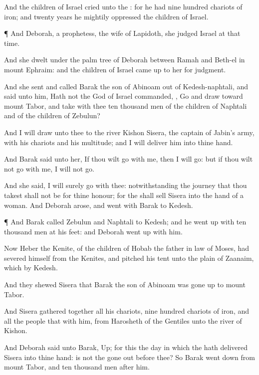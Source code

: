 {And the
children of
Israel
cried unto the
{}: for he had
nine
hundred
chariots of
iron; and
twenty
years he
mightily
oppressed the
children of
Israel.


\par }{\PP {}¶ And
Deborah, a
prophetess, the
wife of
Lapidoth, she
judged
Israel at that
time.

And she
dwelt under the palm
tree of
Deborah between
Ramah and
Beth-el in
mount
Ephraim: and the
children of
Israel came
up to her for
judgment.

And she
sent and
called
Barak the
son of
Abinoam out of
Kedesh-naphtali, and
said unto him, Hath not the
{}
God of
Israel
commanded,
{},
Go and
draw toward
mount
Tabor, and
take with thee
ten
thousand
men of the
children of
Naphtali and of the
children of
Zebulun?

And I will
draw unto thee to the
river
Kishon
Sisera, the
captain of
Jabin’s
army, with his
chariots and his
multitude; and I will
deliver him into thine
hand.

And
Barak
said unto her, If thou wilt
go with me, then I will
go: but if thou wilt not
go with me,
{} I will not
go.

And she
said, I will
surely
go with thee:
notwithstanding the
journey that thou
takest shall not be for thine
honour; for the
{} shall
sell
Sisera into the
hand of a
woman. And
Deborah
arose, and
went with
Barak to
Kedesh.


\par }{\PP {}¶ And
Barak
called
Zebulun and
Naphtali to
Kedesh; and he went
up with
ten
thousand
men at his
feet: and
Deborah went
up with him.

Now
Heber the
Kenite,
{} of the
children of
Hobab the father in
law of
Moses, had
severed himself from the
Kenites, and
pitched his
tent unto the
plain of
Zaanaim, which
{} by
Kedesh.

And they
shewed
Sisera that
Barak the
son of
Abinoam was gone
up to
mount
Tabor.

And
Sisera gathered
together all his
chariots,
{}
nine
hundred
chariots of
iron, and all the
people that
{} with him, from
Harosheth of the
Gentiles unto the
river of
Kishon.

And
Deborah
said unto
Barak,
Up; for this
{} the
day in which the
{} hath
delivered
Sisera into thine
hand: is not the
{} gone
out
before thee? So
Barak went
down from
mount
Tabor, and
ten
thousand
men
after him.

}
